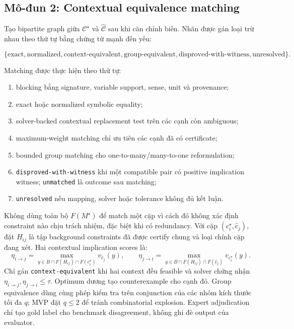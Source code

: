 \documentclass[11pt,a4paper]{article}
\begin{document}
\subsection{Mô-đun 2: Contextual equivalence matching}

Tạo bipartite graph giữa \(\mathcal C^\star\) và
\(\widehat{\mathcal C}\) sau khi căn chỉnh biến. Nhãn được gán loại trừ nhau
theo thứ tự bằng chứng từ mạnh đến yếu:

\[
\{\text{exact},\text{normalized},\text{context-equivalent},
\text{group-equivalent},\text{disproved-with-witness},
\text{unresolved}\}.
\]

Matching được thực hiện theo thứ tự:

\begin{enumerate}
  \item blocking bằng signature, variable support, sense, unit và provenance;
  \item exact hoặc normalized symbolic equality;
  \item solver-backed contextual replacement test trên các cạnh còn ambiguous;
  \item maximum-weight matching chỉ ưu tiên các cạnh đã có certificate;
  \item bounded group matching cho one-to-many/many-to-one reformulation;
  \item \texttt{disproved-with-witness} khi một compatible pair có positive
  implication witness; \texttt{unmatched} là outcome sau matching;
  \item \texttt{unresolved} nếu mapping, solver hoặc tolerance không đủ kết luận.
\end{enumerate}

Không dùng toàn bộ \(F(M^\star)\) để match một cặp vì cách đó không xác định
constraint nào chịu trách nhiệm, đặc biệt khi có redundancy. Với cặp
\((c_i^\star,\hat c_j)\), đặt \(H_{ij}\) là tập background constraints đã được
certify chung và loại chính cặp đang xét. Hai contextual implication scores là:
\[
\eta_{i\rightarrow j}=
\max_{y\in B\cap F(H_{ij})\cap F(c_i^\star)}v_{\hat c_j}(y),
\qquad
\eta_{j\rightarrow i}=
\max_{y\in B\cap F(H_{ij})\cap F(\hat c_j)}v_{c_i^\star}(y).
\]
Chỉ gán \texttt{context-equivalent} khi hai context đều feasible và solver
chứng nhận \(\eta_{i\rightarrow j},\eta_{j\rightarrow i}\leq\tau\). Optimum
dương tạo counterexample cho cạnh đó. Group equivalence dùng cùng phép kiểm tra
trên conjunction của các nhóm kích thước tối đa \(q\); MVP đặt \(q\leq2\) để
tránh combinatorial explosion. Expert adjudication chỉ tạo gold label cho
benchmark disagreement, không ghi đè output của evaluator.
\end{document}

